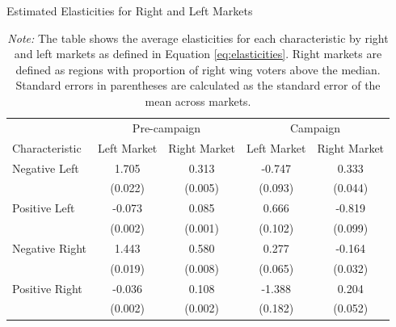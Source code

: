 \documentclass[12pt]{article}
\begin{document}
	
	

	
	
	\begin{table}[!htb]
		\centering
		\caption{Estimated Elasticities for Right and Left Markets}
		\begin{tabular}{l|cc|cc}
			\toprule
			& \multicolumn{2}{c|}{Pre-campaign} & \multicolumn{2}{c}{Campaign} \\
			Characteristic & Left Market & Right Market & Left Market & Right Market \\
			\midrule
			Negative Left & 1.705 & 0.313 & -0.747 & 0.333 \\
			& (0.022) & (0.005) & (0.093) & (0.044) \\
			Positive Left & -0.073 & 0.085 & 0.666 & -0.819 \\
			& (0.002) & (0.001) & (0.102) & (0.099) \\
			Negative Right & 1.443 & 0.580 & 0.277 & -0.164 \\
			& (0.019) & (0.008) & (0.065) & (0.032) \\
			Positive Right & -0.036 & 0.108 & -1.388 & 0.204 \\
			& (0.002) & (0.002) & (0.182) & (0.052) \\
			\bottomrule
		\end{tabular}
			\caption*{\textit{Note:} \small The table shows the average elasticities for each characteristic by right and left markets as defined in Equation \ref{eq:elasticities}. Right markets are defined as regions with proportion of right wing voters above the median. Standard errors in parentheses are calculated as the standard error of the mean across markets.}
					\label{tab:elasticities}
	\end{table}
	
\end{document}
